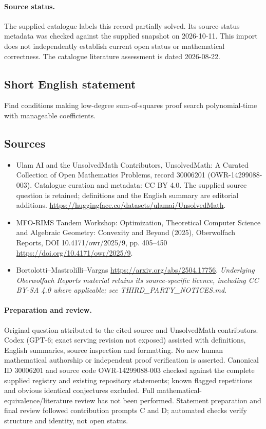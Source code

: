\documentclass[11pt]{article}
\begin{document}
\paragraph{Source status.}
The supplied catalogue labels this record partially solved. Its source-status metadata was checked against the supplied snapshot on 2026-10-11. This import does not independently establish current open status or mathematical correctness. The catalogue literature assessment is dated 2026-08-22.
\subsection{Short English statement}
Find conditions making low-degree sum-of-squares proof search polynomial-time with manageable coefficients.
\subsection{Sources}
\begin{itemize}
\item[\hypertarget{source:30006201:1}{S1}] Ulam AI and the UnsolvedMath Contributors, UnsolvedMath: A Curated Collection of Open Mathematics Problems, record 30006201 (OWR-14299088-003). Catalogue curation and metadata: CC BY 4.0. The supplied source question is retained; definitions and the English summary are editorial additions.
\url{https://huggingface.co/datasets/ulamai/UnsolvedMath}.
\item[\hypertarget{source:30006201:2}{S2}] MFO-RIMS Tandem Workshop: Optimization, Theoretical Computer Science and Algebraic Geometry: Convexity and Beyond (2025), Oberwolfach Reports, DOI 10.4171/owr/2025/9, pp. 405--450
\url{https://doi.org/10.4171/owr/2025/9}.
\item[\hypertarget{source:30006201:3}{S3}] Bortolotti--Mastrolilli--Vargas
\url{https://arxiv.org/abs/2504.17756}.
\textit{Underlying Oberwolfach Reports material retains its source-specific licence, including CC BY-SA 4.0 where applicable; see THIRD\_PARTY\_NOTICES.md.}
\end{itemize}
\paragraph{Preparation and review.}
Original question attributed to the cited source and UnsolvedMath contributors. Codex (GPT-6; exact serving revision not exposed) assisted with definitions, English summaries, source inspection and formatting. No new human mathematical authorship or independent proof verification is asserted. Canonical ID 30006201 and source code OWR-14299088-003 checked against the complete supplied registry and existing repository statements; known flagged repetitions and obvious identical conjectures excluded. Full mathematical-equivalence/literature review has not been performed. Statement preparation and final review followed contribution prompts C and D; automated checks verify structure and identity, not open status.
\label{end:30006201}
\end{document}
